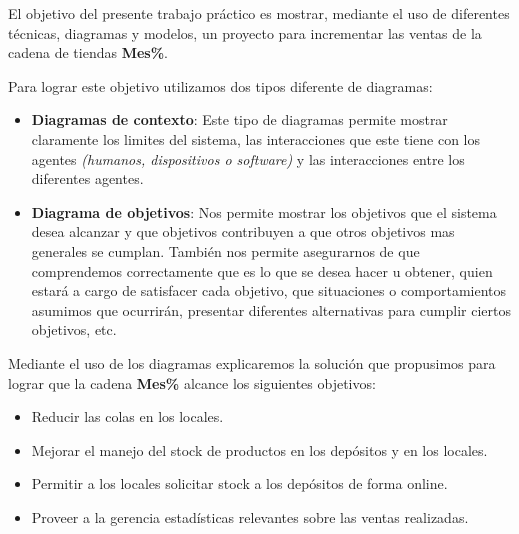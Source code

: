 El objetivo del presente trabajo práctico es mostrar, mediante el uso de diferentes técnicas, diagramas y modelos, un proyecto para incrementar las ventas de la cadena de tiendas \textbf{Mes\%}.

Para lograr este objetivo utilizamos dos tipos diferente de diagramas:
\begin{itemize}
	\item\textbf{ Diagramas de contexto}: Este tipo de diagramas permite mostrar claramente los limites del sistema, las interacciones que este tiene con los agentes \textit{(humanos, dispositivos o software)} y las interacciones entre los diferentes agentes.
	\item \textbf{Diagrama de objetivos}: Nos permite mostrar los objetivos que el sistema desea alcanzar y que objetivos contribuyen a que otros objetivos mas generales se cumplan. También nos permite asegurarnos de que comprendemos correctamente que es lo que se desea hacer u obtener, quien estará a cargo de satisfacer cada objetivo, que situaciones o comportamientos asumimos que ocurrirán, presentar diferentes alternativas para cumplir ciertos objetivos, etc.
\end{itemize}

Mediante el uso de los diagramas explicaremos la solución que propusimos para lograr que la cadena \textbf{Mes\%} alcance los siguientes objetivos:
\begin{itemize}
	\item Reducir las colas en los locales.
	\item Mejorar el manejo del stock de productos en los depósitos y en los locales.
	\item Permitir a los locales solicitar stock a los depósitos de forma online.
	\item Proveer a la gerencia estadísticas relevantes sobre las ventas realizadas.
\end{itemize}
